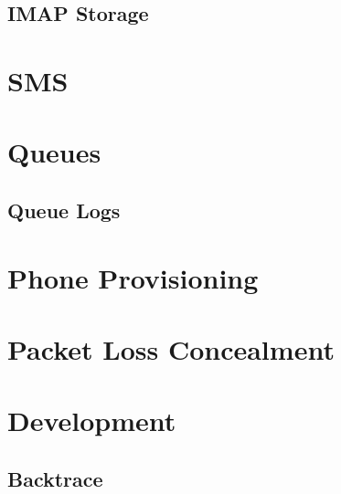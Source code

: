 \documentclass[12pt,a4]{report}
\begin{document}
  \section{IMAP Storage}
  

\chapter{SMS}


\chapter{Queues}
  
  \section{Queue Logs}
  

\chapter{Phone Provisioning}
  

\chapter{Packet Loss Concealment}
  

\chapter{Development}
  \section{Backtrace}
  



%
%
\end{document}
